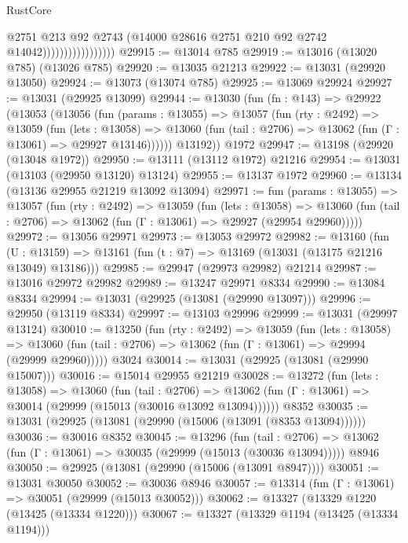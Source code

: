 \begin{lexlean}{RustCore}
\begin{coremodule}
                                    @2751
                                    @213
                                    @92
                                    @2743
                                    (@14000 @28616 @2751 @210 @92 @2742 @14042)))))))))))))))))
@29915 := @13014 @785
@29919 := @13016 (@13020 @785) (@13026 @785)
@29920 := @13035 @21213
@29922 := @13031 (@29920 @13050)
@29924 := @13073 (@13074 @785)
@29925 := @13069 @29924
@29927 := @13031 (@29925 @13099)
@29944 := @13030
    (fun (fn : @143) =>
    @29922
      (@13053
        (@13056
          (fun (params : @13055) =>
          @13057
            (fun (rty : @2492) =>
            @13059
              (fun (lets : @13058) =>
              @13060 (fun (tail : @2706) => @13062 (fun (Γ : @13061) => @29927 @13146))))))
        @13192))
    @1972
@29947 := @13198 (@29920 (@13048 @1972))
@29950 := @13111 (@13112 @1972) @21216
@29954 := @13031 (@13103 (@29950 @13120) @13124)
@29955 := @13137 @1972
@29960 := @13134 (@13136 @29955 @21219 @13092 @13094)
@29971 := fun (params : @13055) =>
  @13057
    (fun (rty : @2492) =>
    @13059
      (fun (lets : @13058) =>
      @13060 (fun (tail : @2706) => @13062 (fun (Γ : @13061) => @29927 (@29954 @29960)))))
@29972 := @13056 @29971
@29973 := @13053 @29972
@29982 := @13160
    (fun (U : @13159) => @13161 (fun (t : @7) => @13169 (@13031 (@13175 @21216 @13049) @13186)))
@29985 := @29947 (@29973 @29982) @21214
@29987 := @13016 @29972 @29982
@29989 := @13247 @29971 @8334
@29990 := @13084 @8334
@29994 := @13031 (@29925 (@13081 (@29990 @13097)))
@29996 := @29950 (@13119 @8334)
@29997 := @13103 @29996
@29999 := @13031 (@29997 @13124)
@30010 := @13250
    (fun (rty : @2492) =>
    @13059
      (fun (lets : @13058) =>
      @13060 (fun (tail : @2706) => @13062 (fun (Γ : @13061) => @29994 (@29999 @29960)))))
    @3024
@30014 := @13031 (@29925 (@13081 (@29990 @15007)))
@30016 := @15014 @29955 @21219
@30028 := @13272
    (fun (lets : @13058) =>
    @13060
      (fun (tail : @2706) =>
      @13062 (fun (Γ : @13061) => @30014 (@29999 (@15013 (@30016 @13092 @13094))))))
    @8352
@30035 := @13031 (@29925 (@13081 (@29990 (@15006 (@13091 (@8353 @13094))))))
@30036 := @30016 @8352
@30045 := @13296
    (fun (tail : @2706) => @13062 (fun (Γ : @13061) => @30035 (@29999 (@15013 (@30036 @13094)))))
    @8946
@30050 := @29925 (@13081 (@29990 (@15006 (@13091 @8947))))
@30051 := @13031 @30050
@30052 := @30036 @8946
@30057 := @13314 (fun (Γ : @13061) => @30051 (@29999 (@15013 @30052)))
@30062 := @13327 (@13329 @1220 (@13425 (@13334 @1220)))
@30067 := @13327 (@13329 @1194 (@13425 (@13334 @1194)))

\end{coremodule}
\end{lexlean}
